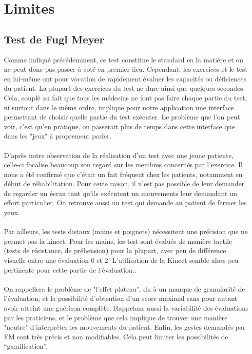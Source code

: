 \section{Limites} \label{limites}%
\subsection{Test de Fugl Meyer}
Comme indiqué précédemment, ce test constitue le standard en la matière et on ne peut donc pas passer à coté en premier lieu.
Cependant, les exercices et le test en lui-même ont pour vocation de rapidement évaluer les capacités ou déficiences
du patient. La plupart des exercices du test ne dure ainsi que quelques secondes. Cela, couplé au fait que tous les 
médecins ne font pas faire chaque partie du test, ni surtout dans le même ordre, implique pour notre application une interface permettant de choisir quelle partie du test exécuter. Le problème que l’on peut voir, c'est qu'en pratique, on passerait 
plus de temps dans cette interface que dans les "jeux" à proprement parler.

\paragraph{}
D'après notre observation de la réalisation d'un test avec une jeune patiente, celle-ci focalise 
beaucoup son regard sur les membres concernés par l'exercice. Il nous a été confirmé que c'était un fait fréquent
chez les patients, notamment en début de réhabilitation. Pour cette raison, il n'est pas possible de leur
demander de regarder un écran tant qu'ils exécutent un mouvements leur demandant un effort particulier.
On retrouve aussi un test qui demande au patient de fermer les yeux.

\paragraph{}
Par ailleurs, les tests distaux (mains et poignets) nécessitent une précision que ne permet pas la kinect.
Pour les mains, les test sont évalués de manière tactile (tests de résistance, de préhension) pour la plupart, 
avec peu de différence visuelle entre une évaluation 0 et 2. L’utilisation de la Kinect semble alors 
peu pertinente pour cette partie de l’évaluation..

\paragraph{}
On rappellera le problème de "l'effet plateau", du à un manque de granularité de l'évaluation, et la possibilité
d'obtention d'un score maximal sans pour autant avoir atteint une guérison complète. Rappelons aussi la variabilité
des évaluations par les praticiens, et le problème que cela implique de trouver une manière "neutre" d'interprêter
les mouvements du patient.
Enfin, les gestes demandés par FM sont très précis et non modifiables. Cela peut limiter les possibilités de “gamification”.
    
